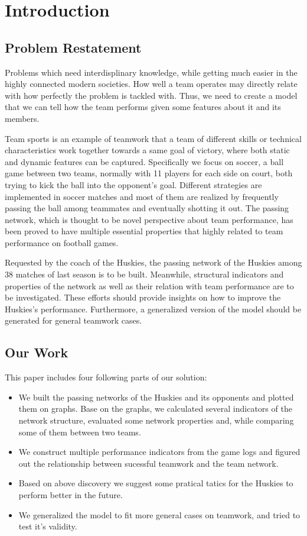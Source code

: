 \documentclass{mcmthesis}
\begin{document}
\section{Introduction}
\subsection{Problem Restatement}
Problems which need interdisplinary knowledge, while getting much easier in the highly connected modern societies. How well a team operates may directly relate with how perfectly the problem is tackled with. Thus, we need to create a model that we can tell how the team performs given some features about it and its members.

Team sports is an example of teamwork that a team of different skills or technical characteristics work together towards a same goal of victory, where both static and dynamic features can be captured. Specifically we focus on soccer, a ball game between two teams, normally with 11 players for each side on court, both trying to kick the ball into the opponent's goal. Different strategies are implemented in soccer matches and most of them are realized by frequently passing the ball among teammates and eventually shotting it out. The passing network, which is thought to be novel perspective about team performance, has been proved to have multiple essential properties that highly related to team performance on football games. 

Requested by the coach of the Huskies, the passing network of the Huskies among 38 matches of last season is to be built. Meanwhile, structural indicators and properties of the network as well as their relation with team performance are to be investigated. These efforts should provide insights on how to improve the Huskies's performance. Furthermore, a generalized version of the model should be generated for general teamwork cases.

\subsection{Our Work}
This paper includes four following parts of our solution:
\begin{itemize}
  \item We built the passing networks of the Huskies and its opponents and plotted them on graphs. Base on the graphs, we calculated several indicators of the network structure, evaluated some network properties and, while comparing some of them between two teams.
  \item We construct multiple performance indicators from the game logs and figured out the relationship between sucessful teamwork and the team network. 
  \item Based on above discovery we suggest some pratical tatics for the Huskies to perform better in the future.
  \item We generalized the model to fit more general cases on teamwork, and tried to test it's validity.
\end{itemize}
\end{document}
